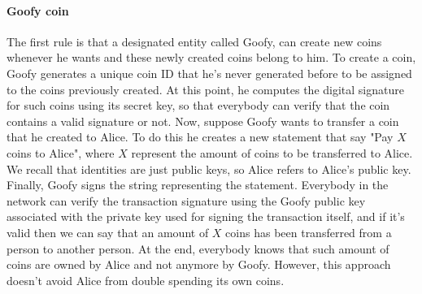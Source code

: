 \paragraph{Goofy coin} The first rule is that a designated entity called Goofy, can create new coins whenever he wants and these newly created coins belong to him. To create a coin, Goofy generates a unique coin ID that he's never generated before to be assigned to the coins previously created. At this point, he computes the digital signature for such coins using its secret key, so that everybody can verify that the coin contains a valid signature or not. Now, suppose Goofy wants to transfer a coin that he created to Alice. To do this he creates a new statement that say "Pay $X$ coins to Alice", where $X$ represent the amount of coins to be transferred to Alice. We recall that identities are just public keys, so Alice refers to Alice's public key. Finally, Goofy signs the string representing the statement. Everybody in the network can verify the transaction signature using the Goofy public key associated with the private key used for signing the transaction itself, and if it's valid then we can say that an amount of $X$ coins has been transferred from a person to another person. At the end, everybody knows that such amount of coins are owned by Alice and not anymore by Goofy. However, this approach doesn't avoid Alice from double spending its own coins.

